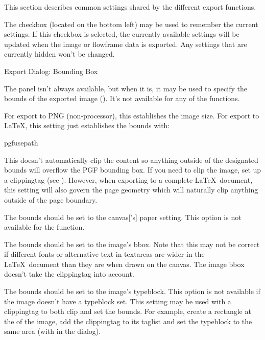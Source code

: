 This section describes common settings shared by the different export functions.


The  checkbox (located on the bottom left)
may be used to remember the current settings. If this checkbox is
selected, the currently available settings will be updated when the
image or \gls{flowframe} data is exported. Any settings that are
currently hidden won't be changed.


 {}
 {Export Dialog: Bounding Box}

The  panel isn't always available, but when it
is, it may be used to specify the bounds of the exported image
().
It's not available for any of the 
functions. 

For export to PNG (non-processor), this establishes the image size.
For export to \LaTeX, this setting just establishes the 
bounds with:
\begin{codebox*}
\gls{pgfusepath}
\end{codebox*}
This doesn't automatically clip the content so anything outside of the designated
bounds will overflow the PGF bounding box. If you need to clip the
image, set up a \gls{clippingtag} (see ).
However, when exporting to a complete \LaTeX\ document, this setting
will also govern the page geometry which will naturally clip
anything outside of the page boundary.


The bounds should be set to the \gls{canvas}['s] paper setting. This
option is not available for the  function.


The bounds should be set to the image's \gls{bbox}.
Note that this may not be correct if different fonts or alternative
text in \glspl{textarea} are wider in the \LaTeX\ document than they
are when drawn on the \gls{canvas}. The image \gls{bbox} doesn't
take the \gls{clippingtag} into account.


The bounds should be set to the image's \gls{typeblock}.
This option is not available if the image doesn't have a
\gls{typeblock} set. This setting may be used with a
\gls{clippingtag} to both clip and set the bounds. For example,
create a rectangle at the  of the image,
add the \gls{clippingtag} to its \gls{taglist} and set the
\gls{typeblock} to the same area (with
 in the 
dialog).

